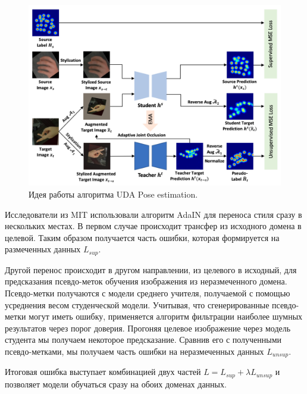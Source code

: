 \begin{figure}[h]
	\centering
	\includegraphics[width=\textwidth]{./images/review/UDA}
	\caption{Идея работы алгоритма UDA Pose estimation. \cite{uda}}
	\label{fig:uda}
\end{figure}

Исследователи из MIT использовали алгоритм AdaIN \cite{adain} для переноса стиля сразу в нескольких местах. В первом случае происходит трансфер из исходного домена в целевой. Таким образом получается часть ошибки, которая формируется на размеченных данных $L_{sup}$.

Другой перенос происходит в другом направлении, из целевого в исходный, для предсказания псевдо-меток обучения изображения из неразмеченного домена. Псевдо-метки получаются с модели среднего учителя, получаемой с помощью усреднения весом студенческой модели. Учитывая, что сгенерированные псевдо-метки могут иметь ошибку, применяется алгоритм фильтрации наиболее шумных результатов через порог доверия. Прогоняя целевое изображение через модель студента мы получаем некоторое предсказание. Сравнив его с полученными псевдо-метками, мы получаем часть ошибки на неразмеченных данных $L_{unsup}$.

Итоговая ошибка выступает комбинацией двух частей $L = L_{sup} + \lambda L_{unsup}$ и позволяет модели обучаться сразу на обоих доменах данных.


\newpage
